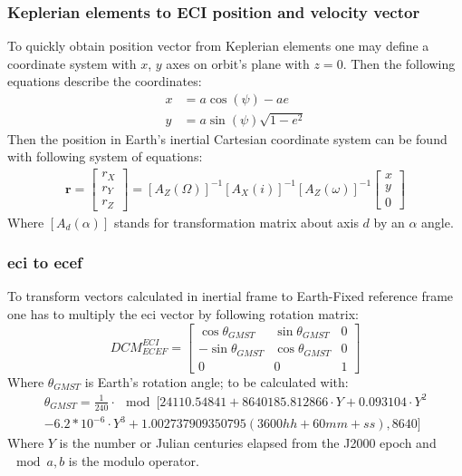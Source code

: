     \subsubsection{Keplerian elements to ECI position and velocity vector}
        To quickly obtain position vector from Keplerian elements one may define a coordinate system with $x$, $y$ axes on orbit's plane with $z=0$. Then the following equations describe the coordinates:
        \begin{align}
            x & = a\cos(\psi) -ae \\
            y &= a\sin(\psi)\sqrt{1-e^2}
        \end{align}
        Then the position in Earth's inertial Cartesian coordinate system can be found with following system of equations:
        \begin{align}
            \textbf{r} = \begin{bmatrix} r_X\\ r_Y\\ r_Z \end{bmatrix} = [A_Z(\Omega)]^{-1} [A_X(i)]^{-1} [A_Z(\omega)]^{-1} \begin{bmatrix} x\\ y\\ 0 \end{bmatrix}
        \end{align}
        Where $[A_d(\alpha)]$ stands for transformation matrix about axis $d$ by an $\alpha$ angle.

    \subsubsection{\ac{eci} to \ac{ecef}}
        To transform vectors calculated in inertial frame to Earth-Fixed reference frame one has to multiply the \ac{eci} vector by following rotation matrix:
        \begin{equation}
            DCM^{ECI}_{ECEF} = \begin{bmatrix} \cos\theta_{GMST} & \sin\theta_{GMST} & 0\\
            -\sin\theta_{GMST} & \cos\theta_{GMST} & 0 \\
            0 & 0 & 1 \end{bmatrix}
        \end{equation}
        Where $\theta_{GMST}$ is Earth's rotation angle; to be calculated with:
        \begin{multline}
        \theta_{GMST}= \frac{1}{240} \cdot \mod[24110.54841 + 8640185.812866 \cdot Y + 0.093104 \cdot Y^2 \\
            - 6.2*10^{-6} \cdot Y^3 + 1.002737909350795\left(3600hh+60mm+ss\right), 8640]
        \end{multline}
        Where $Y$ is the number or Julian centuries elapsed from the J2000 epoch and $\mod{a,b}$ is the modulo operator.

